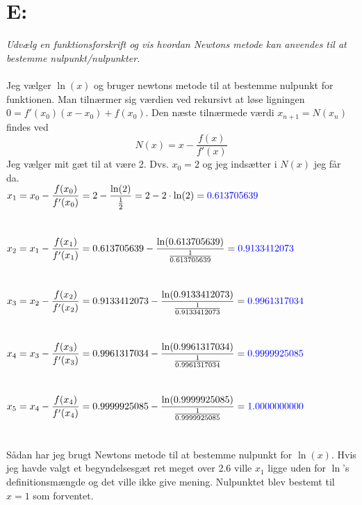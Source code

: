 \documentclass[a4paper, 11pt]{article}
\begin{document}
\section*{E:}
\textit{Udvælg en funktionsforskrift og vis hvordan Newtons metode kan anvendes til at bestemme nulpunkt/nulpunkter.}\\\\
Jeg vælger \(\ln(x)\) og bruger newtons metode til at bestemme nulpunkt for funktionen.
Man tilnærmer sig værdien ved rekursivt at løse ligningen \(0=f'(x_0)(x-x_0)+f(x_0)\). Den næste tilnærmede værdi \(x_{n+1}=N(x_n)\) findes ved
\[N(x)=x-\frac{f(x)}{f'(x)}\]
Jeg vælger mit gæt til at være 2. Dvs. \(x_0=2\) og jeg indsætter i \(N(x)\) jeg får da.\\
\(\displaystyle x_1=x_0-\frac{f(x_0)}{f'(x_0)} = 2- \frac{\ln(2)}{\frac{1}{2}}=2-2\cdot \ln(2)= \textcolor{blue}{0.613705639}\)\\\\\\
\(\displaystyle x_2=x_1-\frac{f(x_1)}{f'(x_1)} = 0.613705639- \frac{\ln(0.613705639)}{\frac{1}{0.613705639}}= \textcolor{blue}{0.9133412073}\)\\\\\\
\(\displaystyle x_3=x_2-\frac{f(x_2)}{f'(x_2)} = 0.9133412073- \frac{\ln(0.9133412073)}{\frac{1}{0.9133412073}}= \textcolor{blue}{0.9961317034}\)\\\\\\
\(\displaystyle x_4=x_3-\frac{f(x_3)}{f'(x_3)} = 0.9961317034- \frac{\ln(0.9961317034)}{\frac{1}{0.9961317034}}= \textcolor{blue}{0.9999925085}\)\\\\\\
\(\displaystyle x_5=x_4-\frac{f(x_4)}{f'(x_4)} = 0.9999925085- \frac{\ln(0.9999925085)}{\frac{1}{0.9999925085}}= \textcolor{blue}{1.0000000000}\)\\\\\\
Sådan har jeg brugt Newtons metode til at bestemme nulpunkt for \(\ln(x)\). Hvis jeg havde valgt et begyndelsesgæt ret meget over 2.6 ville \(x_1\) ligge uden for \(\ln\)'s definitionsmængde og det ville ikke give mening. Nulpunktet blev bestemt til \(x=1\) som forventet.
\clearpage
\end{document}
